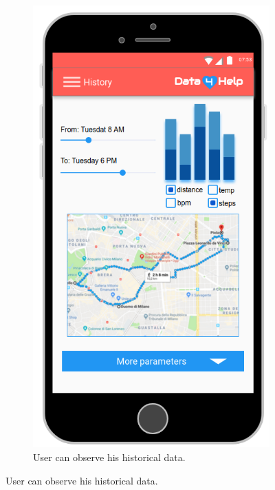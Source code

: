 \begin{figure}[ht]
\begin{subfigure}[t]{0.38\linewidth}
    \includegraphics[width=\linewidth]{images/Mockup/History.png}
    \caption{User can observe his historical data.}
  \end{subfigure}
\end{figure}
\clearpage

